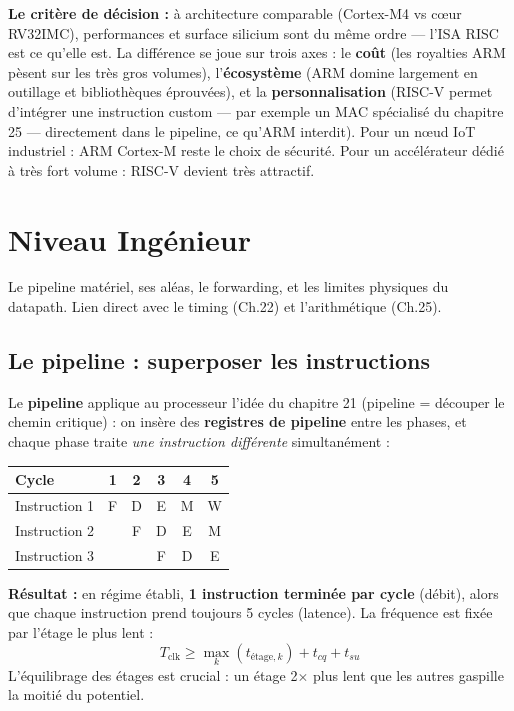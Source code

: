 \documentclass[12pt,a4paper,twoside]{book}
\begin{document}
\begin{intuition}
\textbf{Le critère de décision :} à architecture comparable (Cortex-M4 vs cœur RV32IMC), performances et surface silicium sont du même ordre --- l'ISA RISC est ce qu'elle est. La différence se joue sur trois axes : le \textbf{coût} (les royalties ARM pèsent sur les très gros volumes), l'\textbf{écosystème} (ARM domine largement en outillage et bibliothèques éprouvées), et la \textbf{personnalisation} (RISC-V permet d'intégrer une instruction custom --- par exemple un MAC spécialisé du chapitre 25 --- directement dans le pipeline, ce qu'ARM interdit). Pour un nœud IoT industriel : ARM Cortex-M reste le choix de sécurité. Pour un accélérateur dédié à très fort volume : RISC-V devient très attractif.
\end{intuition}

\section{Niveau Ingénieur}

\begin{ingenieur}
Le pipeline matériel, ses aléas, le forwarding, et les limites physiques du datapath. Lien direct avec le timing (Ch.22) et l'arithmétique (Ch.25).
\end{ingenieur}

\subsection{Le pipeline : superposer les instructions}

\begin{formule}
Le \textbf{pipeline} applique au processeur l'idée du chapitre 21 (pipeline = découper le chemin critique) : on insère des \textbf{registres de pipeline} entre les phases, et chaque phase traite \textit{une instruction différente} simultanément :

\begin{center}
\renewcommand{\arraystretch}{1.3}
\begin{tabular}{l|ccccc}
\toprule
\textbf{Cycle} & 1 & 2 & 3 & 4 & 5 \\
\midrule
Instruction 1 & F & D & E & M & W \\
Instruction 2 & & F & D & E & M \\
Instruction 3 & & & F & D & E \\
\bottomrule
\end{tabular}
\end{center}

\textbf{Résultat :} en régime établi, \textbf{1 instruction terminée par cycle} (débit), alors que chaque instruction prend toujours 5 cycles (latence). La fréquence est fixée par l'étage le plus lent :
\[
T_{\text{clk}} \geq \max_k(t_{\text{étage},k}) + t_{cq} + t_{su}
\]
L'équilibrage des étages est crucial : un étage 2$\times$ plus lent que les autres gaspille la moitié du potentiel.
\end{formule}
\end{document}
